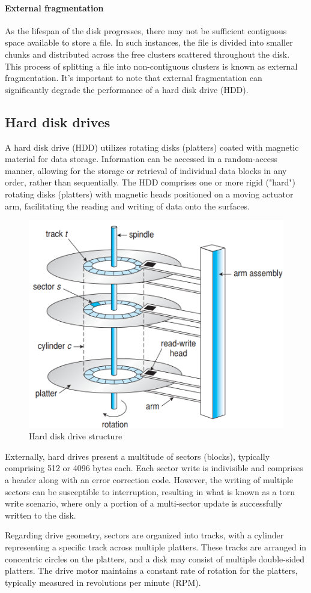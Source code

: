 \paragraph*{External fragmentation}
As the lifespan of the disk progresses, there may not be sufficient contiguous space available to store a file. 
In such instances, the file is divided into smaller chunks and distributed across the free clusters scattered throughout the disk. 
This process of splitting a file into non-contiguous clusters is known as external fragmentation. 
It's important to note that external fragmentation can significantly degrade the performance of a hard disk drive (HDD).

\subsection{Hard disk drives}
A hard disk drive (HDD) utilizes rotating disks (platters) coated with magnetic material for data storage. 
Information can be accessed in a random-access manner, allowing for the storage or retrieval of individual data blocks in any order, rather than sequentially. 
The HDD comprises one or more rigid ("hard") rotating disks (platters) with magnetic heads positioned on a moving actuator arm, facilitating the reading and writing of data onto the surfaces.
\begin{figure}[H]
    \centering
    \includegraphics[width=0.5\linewidth]{images/hdds.png}
    \caption{Hard disk drive structure}
\end{figure}
Externally, hard drives present a multitude of sectors (blocks), typically comprising 512 or 4096 bytes each. 
Each sector write is indivisible and comprises a header along with an error correction code. 
However, the writing of multiple sectors can be susceptible to interruption, resulting in what is known as a torn write scenario, where only a portion of a multi-sector update is successfully written to the disk.

Regarding drive geometry, sectors are organized into tracks, with a cylinder representing a specific track across multiple platters. 
These tracks are arranged in concentric circles on the platters, and a disk may consist of multiple double-sided platters.
The drive motor maintains a constant rate of rotation for the platters, typically measured in revolutions per minute (RPM).

